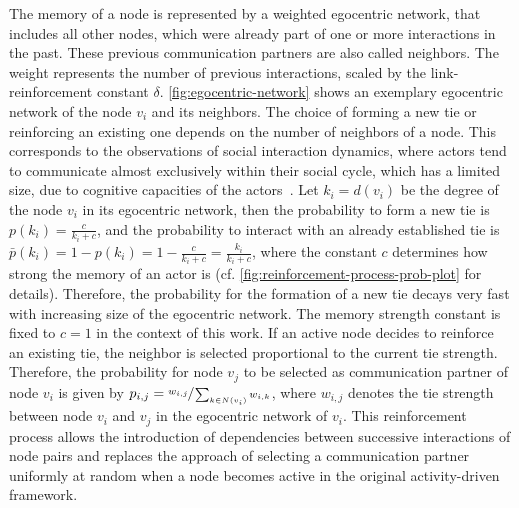 The memory of a node is represented by a weighted egocentric network, that includes all other nodes, which were already part of one or more interactions in the past.
These previous communication partners are also called neighbors.
The weight represents the number of previous interactions, scaled by the link-reinforcement constant \( \delta \).
\autoref{fig:egocentric-network} shows an exemplary egocentric network of the node \( v_{i} \) and its neighbors.
The choice of forming a new tie or reinforcing an existing one depends on the number of neighbors of a node.
This corresponds to the observations of social interaction dynamics, where actors tend to communicate almost exclusively within their social cycle, which has a limited size, due to cognitive capacities of the actors~\cite{Dunbar1992}.
Let \( k_{i} = d(v_{i}) \) be the degree of the node \( v_{i} \) in its egocentric network, then the probability to form a new tie is \( p(k_{i}) = \frac{c}{k_{i} + c} \), and the probability to interact with an already established tie is \( \bar{p}(k_{i}) = 1 - p(k_{i}) = 1 - \frac{c}{k_{i} + c} = \frac{k_{i}}{k_{i} + c} \), where the constant \(c\) determines how strong the memory of an actor is (cf.  \autoref{fig:reinforcement-process-prob-plot} for details).
Therefore, the probability for the formation of a new tie decays very fast with increasing size of the egocentric network.
The memory strength constant is fixed to \( c = 1 \) in the context of this work.
If an active node decides to reinforce an existing tie, the neighbor is selected proportional to the current tie strength.
Therefore, the probability for node \( v_{j} \) to be selected as communication partner of node \( v_{i} \) is given by
\( p_{i,j} = \sfrac{w_{i,j}}{\sum_{k \in N(v_{i})} w_{i, k}} \), where \( w_{i,j} \) denotes the tie strength between node \( v_{i} \) and \( v_{j} \) in the egocentric network of \( v_{i} \).
This reinforcement process allows the introduction of dependencies between successive interactions of node pairs and replaces the approach of selecting a communication partner uniformly at random when a node becomes active in the original activity-driven framework.


